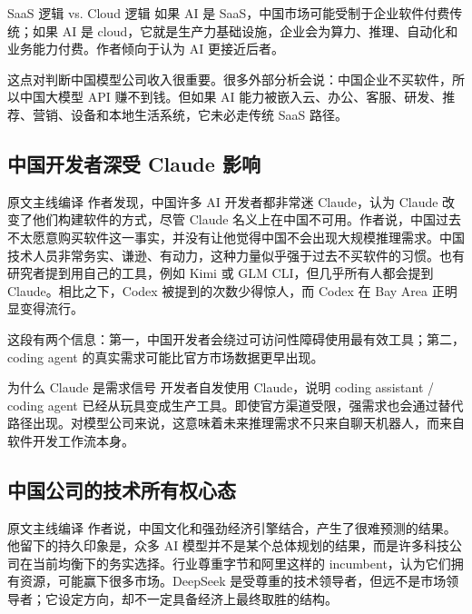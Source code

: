 \documentclass[a4paper]{article}
\begin{document}
\begin{importantbox}{SaaS 逻辑 vs. Cloud 逻辑}
如果 AI 是 SaaS，中国市场可能受制于企业软件付费传统；如果 AI 是 cloud，它就是生产力基础设施，企业会为算力、推理、自动化和业务能力付费。作者倾向于认为 AI 更接近后者。
\end{importantbox}

这点对判断中国模型公司收入很重要。很多外部分析会说：中国企业不买软件，所以中国大模型 API 赚不到钱。但如果 AI 能力被嵌入云、办公、客服、研发、推荐、营销、设备和本地生活系统，它未必走传统 SaaS 路径。

\subsection{中国开发者深受 Claude 影响}

\begin{translationbox}{原文主线编译}
作者发现，中国许多 AI 开发者都非常迷 Claude，认为 Claude 改变了他们构建软件的方式，尽管 Claude 名义上在中国不可用。作者说，中国过去不太愿意购买软件这一事实，并没有让他觉得中国不会出现大规模推理需求。中国技术人员非常务实、谦逊、有动力，这种力量似乎强于过去不买软件的习惯。也有研究者提到用自己的工具，例如 Kimi 或 GLM CLI，但几乎所有人都会提到 Claude。相比之下，Codex 被提到的次数少得惊人，而 Codex 在 Bay Area 正明显变得流行。
\end{translationbox}

这段有两个信息：第一，中国开发者会绕过可访问性障碍使用最有效工具；第二，coding agent 的真实需求可能比官方市场数据更早出现。

\begin{knowledgebox}{为什么 Claude 是需求信号}
开发者自发使用 Claude，说明 coding assistant / coding agent 已经从玩具变成生产工具。即使官方渠道受限，强需求也会通过替代路径出现。对模型公司来说，这意味着未来推理需求不只来自聊天机器人，而来自软件开发工作流本身。
\end{knowledgebox}

\subsection{中国公司的技术所有权心态}

\begin{translationbox}{原文主线编译}
作者说，中国文化和强劲经济引擎结合，产生了很难预测的结果。他留下的持久印象是，众多 AI 模型并不是某个总体规划的结果，而是许多科技公司在当前均衡下的务实选择。行业尊重字节和阿里这样的 incumbent，认为它们拥有资源，可能赢下很多市场。DeepSeek 是受尊重的技术领导者，但远不是市场领导者；它设定方向，却不一定具备经济上最终取胜的结构。
\end{translationbox}
\end{document}
